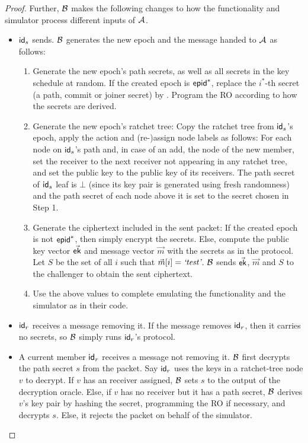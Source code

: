 \begin{proof}
Further, $\mathcal{B}_{\relax}$ makes the following changes to how the functionality and simulator process different inputs of $\mathcal{A}_{\relax}$.
\begin{itemize}
  \item {\sc ${\mathsf{id}}_s$ sends.} $\mathcal{B}_{\relax}$ generates the new epoch and the message handed to $\mathcal{A}_{\relax}$ as follows:
    \begin{enumerate}
      \item Generate the new epoch's path secrets, as well as all secrets in the key schedule at random. If the created epoch is ${\normalfont\textsf{epid}}^*$, replace the $i^*$-th secret (a path, commit or joiner secret) by . Program the RO according to how the secrets are derived.
      \item Generate the new epoch's ratchet tree: Copy the ratchet tree from ${\mathsf{id}}_s$'s epoch, apply the action and (re-)assign node labels as follows: For each node on ${\mathsf{id}}_s$'s path and, in case of an add, the node of the new member, set the \mmowrcca receiver to the next receiver not appearing in any ratchet tree, and set the public key to the public key of its receivers. The path secret of ${\mathsf{id}}_s$ leaf is $\bot$ (since its key pair is generated using fresh randomness) and the path secret of each node above it is set to the secret chosen in Step 1.
      \item Generate the ciphertext included in the sent packet: If the created epoch is not ${\normalfont\textsf{epid}}^*$, then simply encrypt the secrets. Else, compute the public key vector $\vec {{\mathsf{ek}}}$ and message vector $\vec m$ with the secrets as in the protocol. Let $S$ be the set of all $i$ such that $\vec m[i]={\text{\normalfont \it`test'}}$. $\mathcal{B}_{\relax}$ sends $\vec{{\mathsf{ek}}}$, $\vec m$ and $S$ to the challenger to obtain the sent ciphertext.
      \item Use the above values to complete emulating the functionality and the simulator as in their code.
    \end{enumerate}
  \item {\sc ${\mathsf{id}}_r$ receives a message removing it.}
    If the message removes ${\mathsf{id}}_r$, then it carries no secrets, so $\mathcal{B}_{\relax}$ simply runs ${\mathsf{id}}_r$'s protocol.
  \item {\sc A current member ${\mathsf{id}}_r$ receives a message not removing it.}
    $\mathcal{B}_{\relax}$ first decrypts the path secret $s$ from the packet. Say ${\mathsf{id}}_r$ uses the keys in a ratchet-tree node $v$ to decrypt. If $v$ has an \mmowrcca receiver assigned, $\mathcal{B}_{\relax}$ sets $s$ to the output of the decryption oracle. Else, if $v$ has no receiver but it has a path secret, $\mathcal{B}_{\relax}$ derives $v$'s key pair by hashing the secret, programming the RO if necessary, and decrypts $s$. Else, it rejects the packet on behalf of the simulator.


\end{itemize}
\end{proof}
